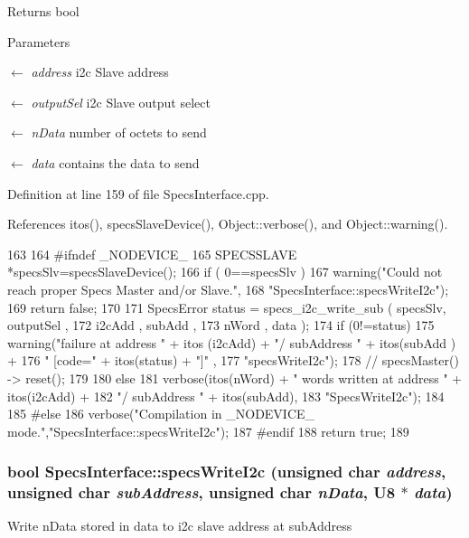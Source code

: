 \begin{DoxyReturn}{Returns}
bool 
\end{DoxyReturn}

\begin{DoxyParams}{Parameters}
\item[\mbox{$\leftarrow$} {\em address}]i2c Slave address \item[\mbox{$\leftarrow$} {\em outputSel}]i2c Slave output select \item[\mbox{$\leftarrow$} {\em nData}]number of octets to send \item[\mbox{$\leftarrow$} {\em data}]contains the data to send \end{DoxyParams}


Definition at line 159 of file SpecsInterface.cpp.

References itos(), specsSlaveDevice(), Object::verbose(), and Object::warning().


\begin{DoxyCode}
163                                             {
164 #ifndef _NODEVICE_
165   SPECSSLAVE *specsSlv=specsSlaveDevice();
166   if ( 0==specsSlv ){
167     warning("Could not reach proper Specs Master and/or Slave.",
168             "SpecsInterface::specsWriteI2c");
169     return false;
170   }
171   SpecsError status = specs_i2c_write_sub ( specsSlv, outputSel , 
172                                             i2cAdd , subAdd , 
173                                             nWord , data );
174   if (0!=status){
175     warning("failure at address " + itos (i2cAdd) + "/ subAddress " + itos(subAdd
      ) +
176             " [code=" + itos(status) + "]" ,
177             "specsWriteI2c");
178     //    specsMaster() -> reset();
179   }
180   else {
181     verbose(itos(nWord) + " words written at address " + itos(i2cAdd) + 
182             "/ subAddress " + itos(subAdd),
183             "SpecsWriteI2c");
184   }
185 #else
186   verbose("Compilation in _NODEVICE_ mode.","SpecsInterface::specsWriteI2c");
187 #endif
188   return true;
189 }
\end{DoxyCode}
\hypertarget{classSpecsInterface_a08dff9a17cd6073cd94fbd2cf7340dbd}{
\subsubsection[{specsWriteI2c}]{\setlength{\rightskip}{0pt plus 5cm}bool SpecsInterface::specsWriteI2c (unsigned char {\em address}, \/  unsigned char {\em subAddress}, \/  unsigned char {\em nData}, \/  {\bf U8} $\ast$ {\em data})}}
\label{classSpecsInterface_a08dff9a17cd6073cd94fbd2cf7340dbd}
Write nData stored in data to i2c slave address at subAddress

